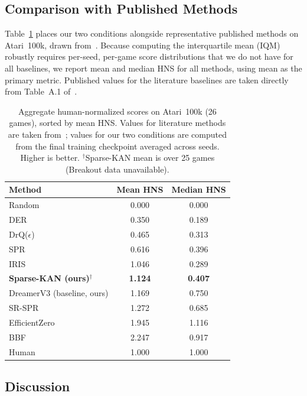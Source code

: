 \documentclass[11pt, a4paper]{article}
\begin{document}
\subsection{Comparison with Published Methods}

Table~\ref{tab:aggregate} places our two conditions alongside representative published
methods on Atari~100k, drawn from~\cite{schwarzer2023bbf}.  Because computing the
interquartile mean (IQM) robustly requires per-seed, per-game
score distributions that we do not have for all baselines, we report mean and
median HNS for all methods, using mean as the primary metric.  Published values for
the literature baselines are taken directly from Table~A.1 of~\cite{schwarzer2023bbf}.

\begin{table}[ht]
\centering
\caption{Aggregate human-normalized scores on Atari~100k (26 games), sorted by mean HNS.
  Values for literature methods are taken from~\cite{schwarzer2023bbf};
  values for our two conditions are computed from the final training checkpoint
  averaged across seeds.  Higher is better.
  $^\dagger$Sparse-KAN mean is over 25 games (Breakout data unavailable).}
\label{tab:aggregate}
\begin{tabular}{lcc}
\toprule
Method & Mean HNS & Median HNS \\
\midrule
Random                     & 0.000 & 0.000 \\
DER                        & 0.350 & 0.189 \\
DrQ($\epsilon$)            & 0.465 & 0.313 \\
SPR                        & 0.616 & 0.396 \\
IRIS                       & 1.046 & 0.289 \\
\textbf{Sparse-KAN (ours)}$^\dagger$ & \textbf{1.124} & \textbf{0.407} \\
DreamerV3 (baseline, ours) & 1.169 & 0.750 \\
SR-SPR                     & 1.272 & 0.685 \\
EfficientZero              & 1.945 & 1.116 \\
BBF                        & 2.247 & 0.917 \\
\midrule
Human                      & 1.000 & 1.000 \\
\bottomrule
\end{tabular}
\end{table}

\subsection{Discussion}
\end{document}
